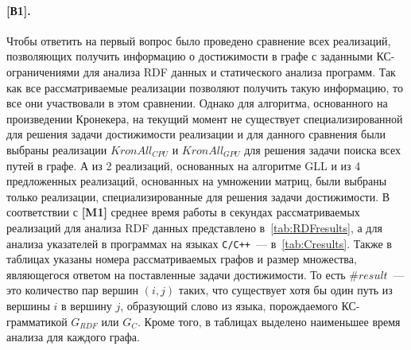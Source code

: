 \paragraph{[В1].} Чтобы ответить на первый вопрос было проведено сравнение всех реализаций, позволяющих получить информацию о достижимости в графе с заданными КС-ограничениями для анализа RDF данных и статического анализа программ. Так как все рассматриваемые реализации позволяют получить такую информацию, то все они участвовали в этом сравнении. Однако для алгоритма, основанного на произведении Кронекера, на текущий момент не существует специализированной для решения задачи достижимости реализации и для данного сравнения были выбраны реализации $\textit{KronAll}_{\textit{CPU}}$ и $\textit{KronAll}_{\textit{GPU}}$ для решения задачи поиска всех путей в графе. А из 2 реализаций, основанных на алгоритме GLL и из 4 предложенных реализаций, основанных на умножении матриц, были выбраны только реализации, специализированные для решения задачи достижимости. В соответствии с \textbf{[M1]} среднее время работы в секундах рассматриваемых реализаций для анализа RDF данных представлено в~\cref{tab:RDFresults}, а для анализа указателей в программах на языках \texttt{C/C++}~--- в~\cref{tab:Cresults}. Также в таблицах указаны номера рассматриваемых графов и размер множества, являющегося ответом на поставленные задачи достижимости. То есть $\#\textit{result}$~--- это количество пар вершин $(i, j)$ таких, что существует хотя бы один путь из вершины $i$ в вершину $j$, образующий слово из языка, порождаемого КС-грамматикой $G_{\textit{RDF}}$ или $G_C$. Кроме того, в таблицах выделено наименьшее время анализа для каждого графа.

